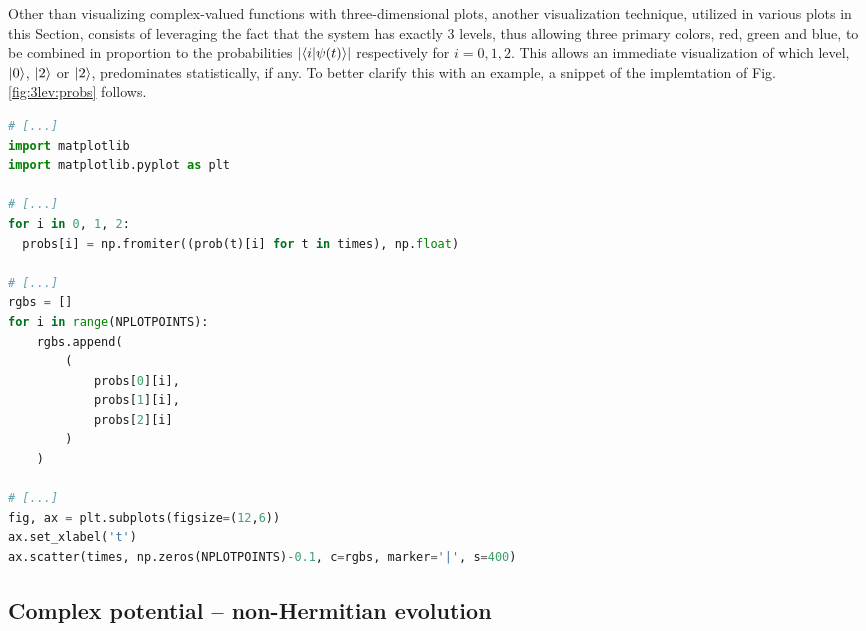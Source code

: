 Other than visualizing complex-valued functions with three-dimensional plots,
another visualization technique, utilized in various plots in this Section,
consists of leveraging
the fact that the system has exactly 3 levels,
thus allowing three primary colors, red, green and blue, to be combined
in proportion to the probabilities $\abs{\braket{i}{\psi(t)}}$
respectively for $i = 0, 1, 2$. This allows an immediate visualization
of which level, $\ket{0}$, $\ket{2}$ or $\ket{2}$, predominates statistically, if any.
To better clarify this with an example,
a snippet of the implemtation of Fig. \ref{fig:3lev:probs} follows.
\begin{lstlisting}[language=Python]
# [...]
import matplotlib
import matplotlib.pyplot as plt

# [...]
for i in 0, 1, 2:
  probs[i] = np.fromiter((prob(t)[i] for t in times), np.float)

# [...]
rgbs = []
for i in range(NPLOTPOINTS):
    rgbs.append(
        (
            probs[0][i],
            probs[1][i],
            probs[2][i]
        )
    )

# [...]
fig, ax = plt.subplots(figsize=(12,6))
ax.set_xlabel('t')
ax.scatter(times, np.zeros(NPLOTPOINTS)-0.1, c=rgbs, marker='|', s=400)
\end{lstlisting}


\subsection{Complex potential -- non-Hermitian evolution}


